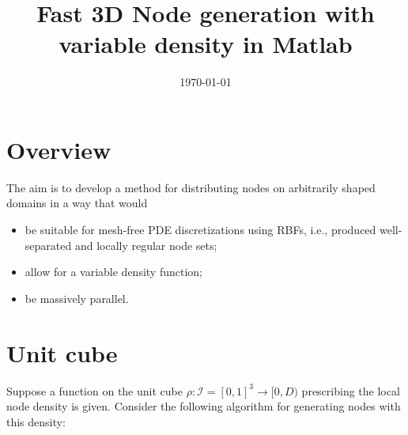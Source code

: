 \documentclass[10pt]{amsart}
\title{Fast 3D Node generation with variable density in Matlab}
\author{}
\date{\today}
\begin{document}
\maketitle

\section{Overview}
The aim is to develop a method for distributing nodes on arbitrarily shaped domains in a way that would 
\begin{itemize}
 \item be suitable for mesh-free PDE discretizations using RBFs, i.e., produced well-separated and locally regular node sets;
 \item allow for a variable density function;
 \item be massively parallel.
\end{itemize}
\section{Unit cube}

Suppose a function on the unit cube  $\rho: \mathcal{I} =[0,1]^3 \to [0,D)$ prescribing the local node density is given.  Consider the following algorithm for generating nodes with this density: 
\end{document}

